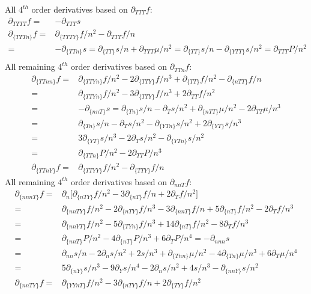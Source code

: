 \documentclass[11pt,letter]{article}
\begin{document}
All $4^{th}$ order derivatives based on $\partial_{TTT}f$:
\begin{equation}
 \begin{split}
  \partial_{TTTT}f=&-\partial_{TTT}s\\
  \partial_{\{TTTn\}}f=&\partial_{\{TTTY\}}f/n^2-\partial_{TTT}f/n\\
   =&-\partial_{\{TTn\}}s=\partial_{\{TT\}}s/n+\partial_{TTT}\mu/n^2=\partial_{\{TT\}}s/n-\partial_{\{YTT\}}s/n^2=\partial_{TTT}P/n^2\\
 \end{split}
\end{equation}
All remaining $4^{th}$ order derivatives based on $\partial_{TTn}f$:
\begin{equation}
 \begin{split}
  \partial_{\{TTnn\}}f=&\partial_{\{TTYn\}}f/n^2-2\partial_{\{TTY\}}f/n^3+\partial_{\{TT\}}f/n^2-\partial_{\{nTT\}}f/n\\
  =&\partial_{\{TTYn\}}f/n^2-3\partial_{\{TTY\}}f/n^3+2\partial_{TT}f/n^2\\
  =&-\partial_{\{nnT\}}s=\partial_{\{Tn\}}s/n-\partial_{T}s/n^2+\partial_{\{nTT\}}\mu/n^2-2\partial_{TT}\mu/n^3\\
  =&\partial_{\{Tn\}}s/n-\partial_{T}s/n^2-\partial_{\{YTn\}}s/n^2+2\partial_{\{YT\}}s/n^3\\
  =&3\partial_{\{YT\}}s/n^3-2\partial_{T}s/n^2-\partial_{\{YTn\}}s/n^2\\
  =&\partial_{\{TTn\}}P/n^2-2\partial_{TT}P/n^3\\
  \partial_{\{TTnY\}}f=&\partial_{\{TTYY\}}f/n^2-\partial_{\{TTY\}}f/n
 \end{split}
\end{equation}
All remaining $4^{th}$ order derivatives based on $\partial_{nnT}f$:
\begin{equation}
 \begin{split}
  \partial_{\{nnnT\}}f=&\partial_{n}\big[\partial_{\{nTY\}}f/n^2-3\partial_{\{nT\}}f/n+2\partial_{T}f/n^2 \big]\\
  =&\partial_{\{nnTY\}}f/n^2-2\partial_{\{nTY\}}f/n^3-3\partial_{\{nnT\}}f/n+5\partial_{\{nT\}}f/n^2-2\partial_Tf/n^3\\
  =&\partial_{\{nnYT\}}f/n^2-5\partial_{\{TYn\}}f/n^3+14\partial_{\{nT\}}f/n^2-8\partial_T f/n^3\\
  =&\partial_{\{nnT\}}P/n^2-4\partial_{\{nT\}}P/n^3+6\partial_{T}P/n^4=-\partial_{nnn}s\\
  =&\partial_{nn}s/n-2\partial_{n}s/n^2+2s/n^3+\partial_{\{Tnn\}}\mu/n^2-4\partial_{\{Tn\}}\mu/n^3+6\partial_{T}\mu/n^4\\
  =&5\partial_{\{nY\}}s/n^3-9\partial_{Y}s/n^4-2\partial_ns/n^2+4s/n^3-\partial_{\{nnY\}}s/n^2\\
  \partial_{\{nnTY\}}f=&\partial_{\{YYnT\}}f/n^2-3\partial_{\{nTY\}}f/n+2\partial_{\{TY\}}f/n^2\\
 \end{split}
\end{equation}
\end{document}
